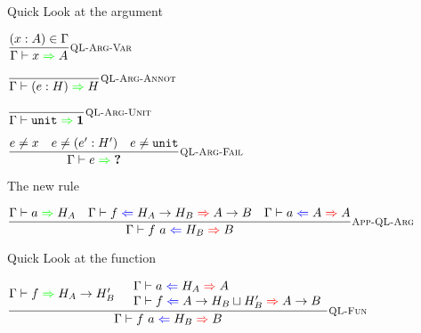 \documentclass{beamer}
\begin{document}
\begin{frame}{Quick Look at the argument}

\begin{center}
  $\infrule[QL-Arg-Var]{\sidecond{(x : A) \in \Gamma}}{\quicklookinfer{x}{A}}$

  \vspace{2em}

  $\infrule[QL-Arg-Annot]{}{\quicklookinfer{\annot{e}{H}}{H}}$

  \vspace{2em}

  $\infrule[QL-Arg-Unit]{}{\quicklookinfer{\unit}{\Unit}}$

  \vspace{2em}

  $\infrule[QL-Arg-Fail]{\sidecond{e \neq x} \quad \sidecond{e \neq \annot{e'}{H'}} \quad \sidecond{e \neq \unit}}{\quicklookinfer{e}{\Hole}}$
\end{center}

\end{frame}

\begin{frame}{The new rule}

\begin{center}
  $\infrule[App-QL-Arg]{\quicklookinfer{a}{H_A} \quad \hinting{f}{\Fun{H_A}{H_B}}{\Fun{A}{B}} \quad \hinting{a}{A}{A}}{\hinting{\app{f}{a}}{H_B}{B}}$
\end{center}

\end{frame}

\begin{frame}{Quick Look at the function}

\begin{center}
  $\infrule[QL-Fun]{\quicklookinfer{f}{\Fun{H_A}{H_B'}} \quad \begin{array}{l} \hinting{a}{H_A}{A} \\ \hinting{f}{\Fun{A}{\hintlub{H_B}{H_B'}}}{\Fun{A}{B}} \end{array}}{\hinting{\app{f}{a}}{H_B}{B}}$
\end{center}

\end{frame}

\newcommand{\fullquicklookhinting}[4]{#1 \vdash #2 \mathcolor{blue}{\Leftarrow} #3 \mathcolor{green}{\Rightarrow} #4}
\newcommand{\quicklookhinting}[3]{\fullquicklookhinting{\Gamma}{#1}{#2}{#3}}
\end{document}
